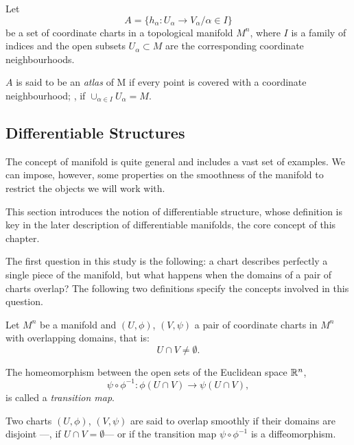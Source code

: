 \begin{definition}
    Let
    \[
    A = \{h_\alpha \colon U_\alpha \to V_\alpha / \alpha \in I\}
    \]
    be a set of coordinate charts in a topological manifold $M^n$, where $I$ is a family of indices and the open subsets $U_\alpha \subset M$ are the corresponding coordinate neighbourhoods.

    $A$ is said to be an \emph{atlas} of M if every point is covered with a coordinate neighbourhood; \ie, if $\cup_{\alpha \in I} U_\alpha = M$.
\end{definition}


\subsection{Differentiable Structures}

The concept of manifold is quite general and includes a vast set of examples. We can impose, however, some properties on the smoothness of the manifold to restrict the objects we will work with.

This section introduces the notion of differentiable structure, whose definition is key in the later description of differentiable manifolds, the core concept of this chapter.

The first question in this study is the following: a chart describes perfectly a single piece of the manifold, but what happens when the domains of a pair of charts overlap? The following two definitions specify the concepts involved in this question.


\begin{definition}
    Let $M^n$ be a manifold and $(U, \phi)$, $(V, \psi)$ a pair of coordinate charts in $M^n$ with overlapping domains, that is:
    \[
        U \cap V \neq \emptyset.
    \]

    The homeomorphism between the open sets of the Euclidean space $\mathbb{R}^n$,
    \[
        \psi \circ \phi^{-1} \colon \phi(U \cap V) \to \psi(U \cap V),
    \]
    is called a \emph{transition map}.
\end{definition}

\begin{definition}
    Two charts $(U, \phi)$, $(V, \psi)$ are said to overlap smoothly if their domains are disjoint ---\ie, if $U \cap V  = \emptyset$--- or if the transition map $\psi \circ \phi^{-1}$ is a diffeomorphism.
\end{definition}

